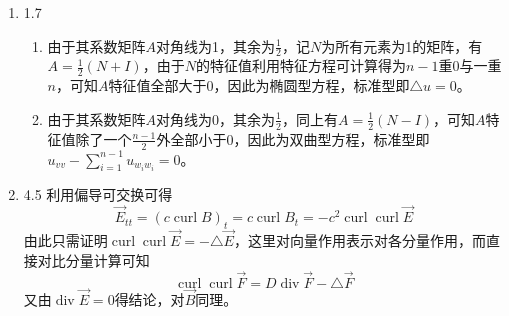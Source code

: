 \documentclass[a4paper,UTF8,fontset=windows,10pt]{ctexart}
\DeclareMathOperator*{\di}{div}
\DeclareMathOperator*{\cu}{curl}
\begin{document}
\begin{enumerate}
    \item 1.7
    \begin{enumerate}[(1)]
        \item 由于其系数矩阵$A$对角线为1，其余为$\frac{1}{2}$，记$N$为所有元素为1的矩阵，有$A=\frac{1}{2}(N+I)$，由于$N$的特征值利用特征方程可计算得为$n-1$重0与一重$n$，可知$A$特征值全部大于0，因此为椭圆型方程，标准型即$\triangle u=0$。
        \item 由于其系数矩阵$A$对角线为0，其余为$\frac{1}{2}$，同上有$A=\frac{1}{2}(N-I)$，可知$A$特征值除了一个$\frac{n-1}{2}$外全部小于0，因此为双曲型方程，标准型即$u_{vv}-\sum_{i=1}^{n-1}u_{w_iw_i}=0$。
    \end{enumerate}
    
    \item 4.5
    利用偏导可交换可得
    $$\vec{E}_{tt}=(c\cu B)_t=c\cu B_t=-c^2\cu\cu\vec{E}$$
    由此只需证明$\cu\cu\vec{E}=-\triangle\vec{E}$，这里对向量作用表示对各分量作用，而直接对比分量计算可知
    $$\cu\cu\vec{F}=D\di\vec{F}-\triangle\vec{F}$$
    又由$\di\vec{E}=0$得结论，对$\vec{B}$同理。
\end{enumerate}
\end{document}
